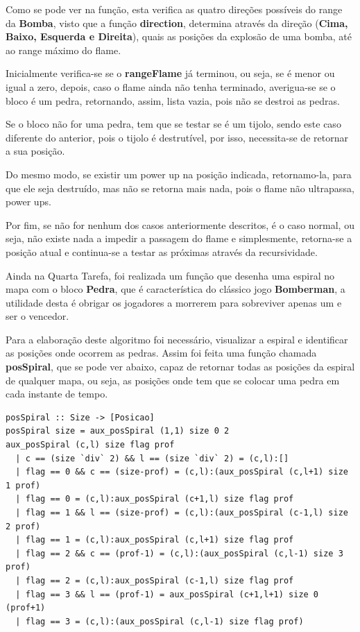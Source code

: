 \documentclass[4apaper]{report}
\begin{document}
Como se pode ver na função, esta verifica as quatro direções possíveis do range da \textbf{Bomba}, visto que a função \textbf{direction}, determina através da direção (\textbf{Cima, Baixo, Esquerda e Direita}), quais as posições da explosão de uma bomba, até ao range máximo do flame. 

Inicialmente verifica-se se o \textbf{rangeFlame} já terminou, ou seja, se é menor ou igual a zero, depois, caso o flame ainda não tenha terminado, averigua-se se o bloco é um pedra, retornando, assim, lista vazia, pois não se destroi as pedras. 

Se o bloco não for uma pedra, tem que se testar se é um tijolo, sendo este caso diferente do anterior, pois o tijolo é destrutível, por isso, necessita-se de retornar a sua posição. 

Do mesmo modo, se existir um power up na posição indicada, retornamo-la, para que ele seja destruído, mas não se retorna mais nada, pois o flame não ultrapassa, power ups.

Por fim, se não for nenhum dos casos anteriormente descritos, é o caso normal, ou seja, não existe nada a impedir a passagem do flame e simplesmente, retorna-se a posição atual e continua-se a testar as próximas através da recursividade.

Ainda na Quarta Tarefa, foi realizada um função que desenha uma espiral no mapa com o bloco \textbf{Pedra}, que é característica do clássico jogo \textbf{Bomberman}, a utilidade desta é obrigar os jogadores a morrerem para sobreviver apenas um e ser o vencedor. 

Para a elaboração deste algoritmo foi necessário, visualizar a espiral e identificar as posições onde ocorrem as pedras. Assim foi feita uma função chamada \textbf{posSpiral}, que se pode ver abaixo, capaz de retornar todas as posições da espiral de qualquer mapa, ou seja, as posições onde tem que se colocar uma pedra em cada instante de tempo. 

\begin{verbatim}
posSpiral :: Size -> [Posicao]
posSpiral size = aux_posSpiral (1,1) size 0 2 
aux_posSpiral (c,l) size flag prof
  | c == (size `div` 2) && l == (size `div` 2) = (c,l):[]
  | flag == 0 && c == (size-prof) = (c,l):(aux_posSpiral (c,l+1) size 1 prof)
  | flag == 0 = (c,l):aux_posSpiral (c+1,l) size flag prof
  | flag == 1 && l == (size-prof) = (c,l):(aux_posSpiral (c-1,l) size 2 prof)  
  | flag == 1 = (c,l):aux_posSpiral (c,l+1) size flag prof
  | flag == 2 && c == (prof-1) = (c,l):(aux_posSpiral (c,l-1) size 3 prof)
  | flag == 2 = (c,l):aux_posSpiral (c-1,l) size flag prof
  | flag == 3 && l == (prof-1) = aux_posSpiral (c+1,l+1) size 0 (prof+1)
  | flag == 3 = (c,l):(aux_posSpiral (c,l-1) size flag prof)
\end{verbatim}
\end{document}
